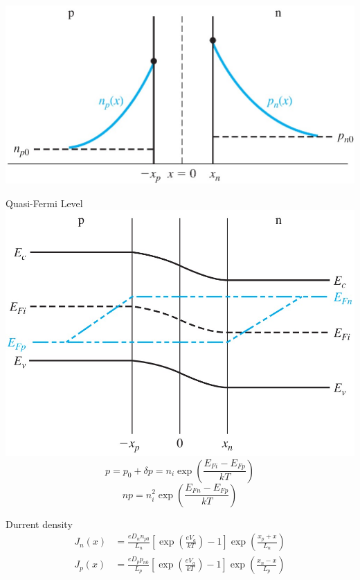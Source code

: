 \documentclass[a4paper, twocolumn]{article}
\begin{document}
        \includegraphics[width=0.6\linewidth]{Forward-biased-solution.jpg} \\
    \par Quasi-Fermi Level \\
        \includegraphics[width=0.6\linewidth]{Quasi-fermi-level.jpg}\\
    \begin{equation*}
        p = p_0 + \delta p = n_i \exp\left( \frac{E_{Fi} - E_{Fp} }{kT}  \right)
    \end{equation*}
    \begin{equation*}
        np = n_i^2 \exp \left( \frac{E_{Fn} - E_{Fp} }{kT}  \right)
    \end{equation*}
    \par Durrent density
    \begin{equation*}
        \begin{aligned}
            J_n(x) &= \frac{e D_n n_{p0}}{L_n} \left[ \exp \left( \frac{e V_a}{kT} \right) - 1 \right] \exp \left( \frac{x_p + x}{L_n} \right) \\
            J_p(x) &= \frac{e D_p p_{n0}}{L_p} \left[ \exp \left( \frac{e V_a}{kT} \right) - 1 \right] \exp \left( \frac{x_n - x}{L_p} \right) \\
        \end{aligned}
    \end{equation*}
    
\end{document}
